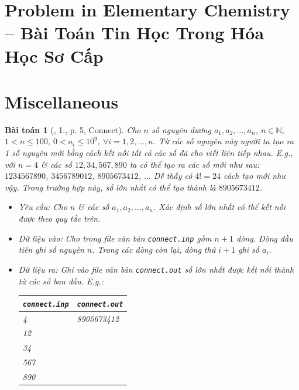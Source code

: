 \documentclass{article}
\newtheorem{baitoan}{Bài toán}
\begin{document}

\section{Problem in Elementary Chemistry -- Bài Toán Tin Học Trong Hóa Học Sơ Cấp}


\section{Miscellaneous}

\begin{baitoan}[\cite{Olympic30-4_2010_Tin_Hoc}, 1., p. 5, Connect]
	Cho $n$ số nguyên dương $a_1,a_2,\ldots,a_n$, $n\in\mathbb{N}$, $1 < n\le100$, $0 < a_i\le10^9$, $\forall i = 1,2,\ldots,n$. Từ các số nguyên này người ta tạo ra 1 số nguyên mới bằng cách kết nối tất cả các số đã cho viết liên tiếp nhau. E.g., với $n = 4$ \& các số $12,34,567,890$ ta có thể tạo ra các số mới như sau: $1234567890$, $3456789012$, $8905673412$, $\ldots$ Dễ thấy có $4! = 24$ cách tạo mới như vậy. Trong trường hợp này, số lớn nhất có thể tạo thành là $8905673412$.
	\begin{itemize}
		\item {\sf Yêu cầu:} Cho $n$ \& các số $a_1,a_2,\ldots,a_n$. Xác định số lớn nhất có thể kết nối được theo quy tắc trên.
		\item {\sf Dữ liệu vào:} Cho trong file văn bản \verb|connect.inp| gồm $n + 1$ dòng. Dòng đầu tiên ghi số nguyên $n$. Trong các dòng còn lại, dòng thứ $i + 1$ ghi số $a_i$.
		\item \emph{Dữ liệu ra:} Ghi vào file văn bản \verb|connect.out| số lớn nhất được kết nối thành từ các số ban đầu. E.g.:
		\begin{table}[H]
			\centering
			\begin{tabular}{|l|l|}
				\hline
				\texttt{connect.inp} & \texttt{connect.out} \\
				\hline
				4 & 8905673412 \\
				12 &  \\
				34 &  \\
				567 &  \\
				890 &  \\
				\hline
			\end{tabular}
		\end{table}
	\end{itemize}
\end{baitoan}
\end{document}
